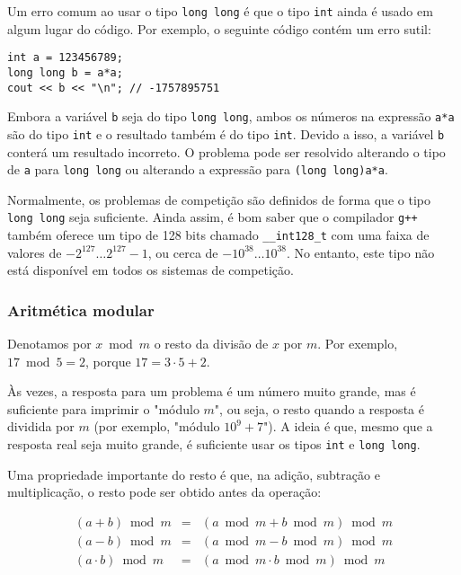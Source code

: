Um erro comum ao usar o tipo \texttt{long long}
é que o tipo \texttt{int} ainda é usado em algum lugar do código.
Por exemplo, o seguinte código contém um erro sutil:

\begin{lstlisting}
int a = 123456789;
long long b = a*a;
cout << b << "\n"; // -1757895751
\end{lstlisting}

Embora a variável \texttt{b} seja do tipo \texttt{long long},
ambos os números na expressão \texttt{a*a} são do tipo \texttt{int} e o resultado também é do tipo \texttt{int}.
Devido a isso, a variável \texttt{b} conterá um resultado incorreto.
O problema pode ser resolvido alterando o tipo de \texttt{a} para \texttt{long long} ou alterando a expressão para \texttt{(long long)a*a}.

Normalmente, os problemas de competição são definidos de forma que o tipo \texttt{long long} seja suficiente. Ainda assim, é bom saber que o compilador \texttt{g++} também oferece um tipo de 128 bits chamado \texttt{\_\_int128\_t} com uma faixa de valores de $-2^{127} \ldots 2^{127}-1$, ou cerca de $-10^{38} \ldots 10^{38}$. No entanto, este tipo não está disponível em todos os sistemas de competição.

\subsubsection{Aritmética modular}


Denotamos por $x \bmod m$ o resto da divisão de $x$ por $m$. Por exemplo, $17 \bmod 5 = 2$, porque $17 = 3 \cdot 5 + 2$.

Às vezes, a resposta para um problema é um número muito grande, mas é suficiente para imprimir o "módulo $m$", ou seja, o resto quando a resposta é dividida por $m$ (por exemplo, "módulo $10^9+7$"). A ideia é que, mesmo que a resposta real seja muito grande, é suficiente usar os tipos \texttt{int} e \texttt{long long}.

Uma propriedade importante do resto é que,
na adição, subtração e multiplicação,
o resto pode ser obtido antes da operação:

\[
\begin{array}{rcr}
(a+b) \bmod m & = & (a \bmod m + b \bmod m) \bmod m \\
(a-b) \bmod m & = & (a \bmod m - b \bmod m) \bmod m \\
(a \cdot b) \bmod m & = & (a \bmod m \cdot b \bmod m) \bmod m
\end{array}
\]

